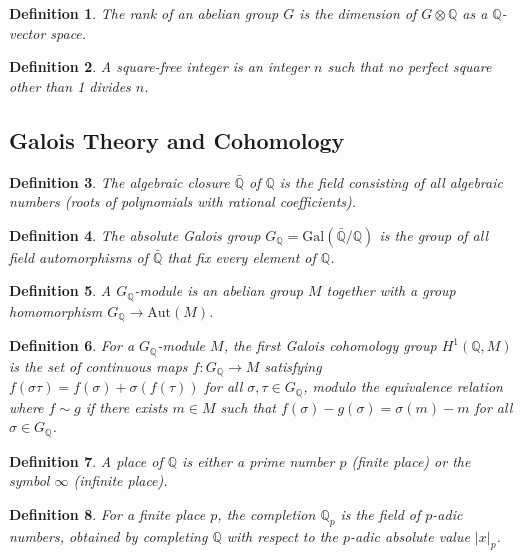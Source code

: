 \documentclass{article}
\newtheorem{definition}{Definition}
\begin{document}
\begin{definition}
  The rank of an abelian group $G$ is the dimension of $G \otimes \mathbb{Q}$
  as a $\mathbb{Q}$-vector space.
\end{definition}

\begin{definition}
  A square-free integer is an integer $n$ such that no perfect square other
  than 1 divides $n$.
\end{definition}

\subsection{Galois Theory and Cohomology}

\begin{definition}
  The algebraic closure $\bar{\mathbb{Q}}$ of $\mathbb{Q}$ is the field
  consisting of all algebraic numbers (roots of polynomials with rational
  coefficients).
\end{definition}

\begin{definition}
  The absolute Galois group $G_{\mathbb{Q}} = \text{Gal} (\bar{\mathbb{Q}}
  /\mathbb{Q})$ is the group of all field automorphisms of $\bar{\mathbb{Q}}$
  that fix every element of $\mathbb{Q}$.
\end{definition}

\begin{definition}
  A $G_{\mathbb{Q}}$-module is an abelian group $M$ together with a group
  homomorphism $G_{\mathbb{Q}} \to \text{Aut} (M)$.
\end{definition}

\begin{definition}
  For a $G_{\mathbb{Q}}$-module $M$, the first Galois cohomology group $H^1
  (\mathbb{Q}, M)$ is the set of continuous maps $f : G_{\mathbb{Q}} \to M$
  satisfying $f (\sigma \tau) = f (\sigma) + \sigma (f (\tau))$ for all
  $\sigma, \tau \in G_{\mathbb{Q}}$, modulo the equivalence relation where $f
  \sim g$ if there exists $m \in M$ such that $f (\sigma) - g (\sigma) =
  \sigma (m) - m$ for all $\sigma \in G_{\mathbb{Q}}$.
\end{definition}

\begin{definition}
  A place of $\mathbb{Q}$ is either a prime number $p$ (finite place) or the
  symbol $\infty$ (infinite place).
\end{definition}

\begin{definition}
  For a finite place $p$, the completion $\mathbb{Q}_p$ is the field of
  $p$-adic numbers, obtained by completing $\mathbb{Q}$ with respect to the
  $p$-adic absolute value $|x|_p$.
\end{definition}
\end{document}
